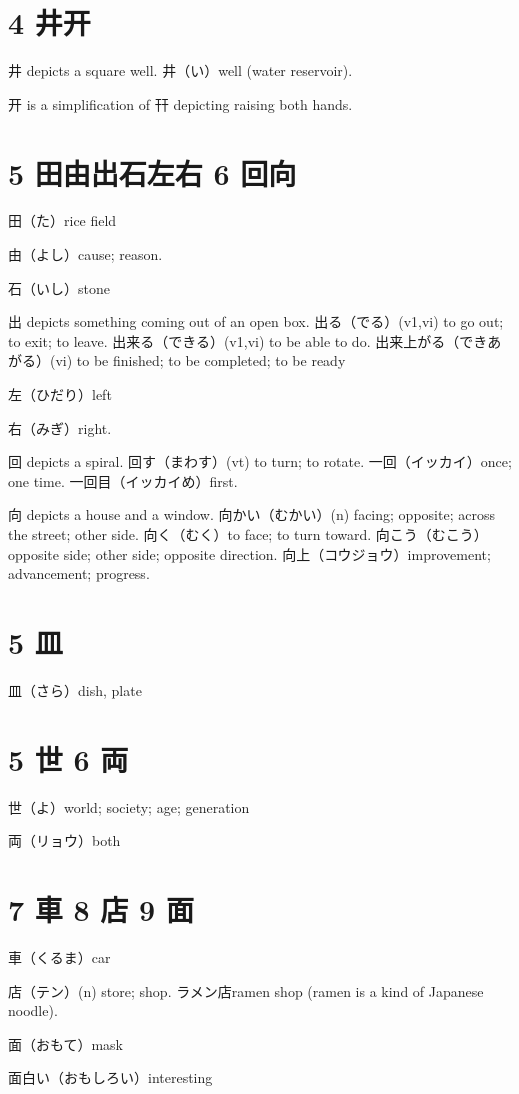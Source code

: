 \section{4 井开}

井 depicts a square well.
井（い）well (water reservoir).

开 is a simplification of 幵 depicting raising both hands.

\section{5 田由出石左右 6 回向}

田（た）rice field

由（よし）cause; reason.

石（いし）stone

出 depicts something coming out of an open box.
出る（でる）(v1,vi) to go out; to exit; to leave.
出来る（できる）(v1,vi) to be able to do.
出来上がる（できあがる）(vi) to be finished; to be completed; to be ready

左（ひだり）left

右（みぎ）right.

回 depicts a spiral.
回す（まわす）(vt) to turn; to rotate.
一回（イッカイ）once; one time.
一回目（イッカイめ）first.

向 depicts a house and a window.
向かい（むかい）(n) facing; opposite; across the street; other side.
向く（むく）to face; to turn toward.
向こう（むこう）opposite side; other side; opposite direction.
向上（コウジョウ）improvement; advancement; progress.

\section{5 皿}

皿（さら）dish, plate

\section{5 世 6 両}

世（よ）world; society; age; generation

両（リョウ）both

\section{7 車 8 店 9 面}

車（くるま）car

店（テン）(n) store; shop.
ラメン店ramen shop (ramen is a kind of Japanese noodle).

面（おもて）mask

面白い（おもしろい）interesting
